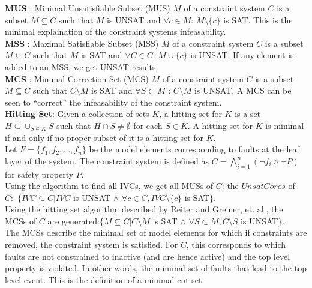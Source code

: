 \textbf{MUS} : Minimal Unsatisfiable Subset (MUS) $M$ of a constraint system $C$ is a subset $M \subseteq C$ such that $M$ is UNSAT and $\forall c \in M$: $M \setminus \{c\}$ is SAT. This is the minimal explaination of the constraint systems infeasability. \\

\textbf{MSS} : Maximal Satisfiable Subset (MSS) $M$ of a constraint system $C$ is a subset $M \subseteq C$ such that $M$ is SAT and $\forall C \in C$: $M \cup \{c\}$ is UNSAT. If any element is added to an MSS, we get UNSAT results. \\

\textbf{MCS} : Minimal Correction Set (MCS) $M$ of a constraint system $C$ is a subset $M \subseteq C$ such that $C \setminus M$ is SAT and $\forall S \subset M$ : $C \setminus M$ is UNSAT. A MCS can be seen to ``correct'' the infeasability of the constraint system.\\

\textbf{Hitting Set}: Given a collection of sets $K$, a hitting set for $K$ is a set $H \subseteq \cup_{S \in K} S$ such that $H \cap S \neq \emptyset$ for each $S  \in K$. A hitting set for $K$ is minimal if and only if no proper subset of it is a hitting set for $K$. \\

Let $F = \{f_1, f_2,...,f_n\}$ be the model elements corresponding to faults at the leaf layer of the system. The constraint system is defined as $C = \bigwedge_{i=1}^{n} (\neg f_i \land \neg P)$ for safety property $P$. \\

Using the algorithm to find all IVCs, we get all MUSs of $C$: the $UnsatCores$ of $C: $ $ \{ IVC \subseteq C | IVC$ is UNSAT $\land$ $ \forall c \in C, IVC \setminus \{c\}$ is SAT$\}$.   \\

Using the hitting set algorithm described by Reiter and Greiner, et. al., the MCSs of $C$ are generated:$ \{ M \subseteq C |  C\setminus M$ is SAT $\land$ $ \forall S \subset M, C \setminus S$ is UNSAT$\}$.\\

The MCSs describe the minimal set of model elements for which if constraints are removed, the constraint system is satisfied. For $C$, this corresponds to which faults are not constrained to inactive (and are hence active) and the top level property is violated. In other words, the minimal set of faults that lead to the top level event. This is the definition of a minimal cut set.

